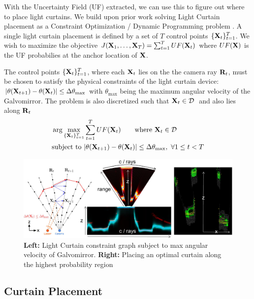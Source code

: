 With the Uncertainty Field (UF) extracted, we can use this to figure out where to place light curtains. We build upon prior work solving Light Curtain placement as a Constraint Optimization / Dynamic Programming problem \cite{Ancha_2020_ECCV}. A single light curtain placement is defined by a set of $T$ control points $\{\mathbf{X}_t\}_{t=1}^T$. We wish to maximize the objective $J(\mathbf{X}_1, \dots, \mathbf{X}_T) = \sum_{t=1}^T UF(\mathbf{X}_t)$ where $UF(\mathbf{X})$ is the UF probabilies at the anchor location of $\mathbf{X}$.

The control points $\{\mathbf{X}_t\}_{t=1}^T$, where each $\mathbf{X}_t$ lies on the the camera ray $\mathbf{R}_t$, must be chosen to satisfy the physical constraints of the light curtain device: $|\theta(\mathbf{X}_{t+1}) - \theta(\mathbf{X}_t)| \leq \Delta \theta_\text{max}$ with $\theta_\text{max}$ being the maximum angular velocity of the Galvomirror. The problem is also discretized such that $\X_{t} \in \D\ $ and also lies along $\mathbf{R}_t$
\begin{align}
    &\arg \max_{\{\mathbf{X}_t\}_{t=1}^T} \sum_{t=1}^T UF(\mathbf{X}_t) \qquad \text{where}\ \mathbf{X}_t \in \mathcal{D}\ \nonumber\\
    &\text{subject to}\ |\theta(\mathbf{X}_{t+1}) - \theta(\mathbf{X}_t)| \leq \Delta \theta_\text{max},\ \forall 1 \leq t < T
    \label{eq:constraint}
\end{align}

\begin{figure}[h]
   \centering
   \begin{minipage}{0.5\textwidth}
       \centering
       \includegraphics[width=1.0\textwidth]{figures/planner.pdf}
   \end{minipage}\hfill
   \centering
   \caption{\textbf{Left:} Light Curtain constraint graph subject to max angular velocity of Galvomirror. \textbf{Right:} Placing an optimal curtain along the highest probability region}
   \label{fig:plannerfig}
\end{figure}

\subsection{Curtain Placement}

